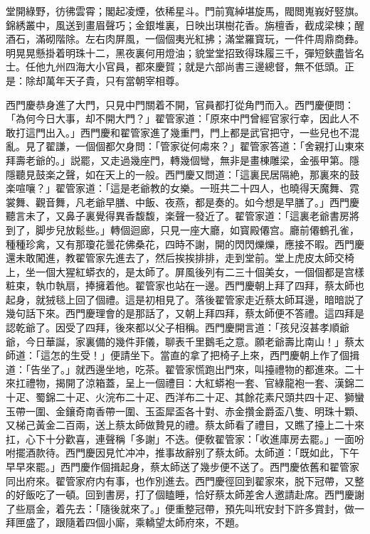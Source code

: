 堂開綠野，彷彿雲霄；閣起凌煙，依稀星斗。門前寬綽堪旋馬，閥閲嵬峩好竪旗。錦綉叢中，風送到畫眉聲巧；金銀堆裏，日映出琪樹花香。旃檀香，截成梁棟；醒酒石，滿砌階除。左右肉屏風，一個個夷光紅拂；滿堂羅寳玩，一件件周鼎商彝。明晃晃懸掛着明珠十二，黑夜裏何用燈油；貌堂堂招致得珠履三千，彈短鋏盡皆名士。任他九州四海大小官員，都來慶賀；就是六部尚書三邊總督，無不低頭。正是：除却萬年天子貴，只有當朝宰相尊。

西門慶恭身進了大門，只見中門關着不開，官員都打從角門而入。西門慶便問：「為何今日大事，却不開大門？」翟管家道：「原來中門曾經官家行幸，因此人不敢打這門出入。」西門慶和翟管家進了幾重門，門上都是武官把守，一些兒也不混亂。見了翟謙，一個個都欠身問：「管家従何䖏來？」翟管家答道：「舍親打山東來拜壽老爺的。」説罷，又走過幾座門，轉幾個彎，無非是畫棟雕梁，金張甲第。隱隱聽見鼓楽之聲，如在天上的一般。西門慶又問道：「這裏民居隔絶，那裏來的鼓楽喧嚷？」翟管家道：「這是老爺教的女樂。一班共二十四人，也曉得天魔舞、霓裳舞、觀音舞，凡老爺早膳、中飯、夜燕，都是奏的。如今想是早膳了。」西門慶聽言未了，又鼻子裏覺得異香馥馥，楽聲一發近了。翟管家道：「這裏老爺書房將到了，脚步兒放鬆些。」轉個迴廊，只見一座大廳，如寳殿僊宫。廳前僊鶴孔雀，種種珍禽，又有那瓊花曇花佛桑花，四時不謝，開的閃閃爍爍，應接不暇。西門慶還未敢闖進，教翟管家先進去了，然后挨挨排排，走到堂前。堂上虎皮太師交椅上，坐一個大猩紅蟒衣的，是太師了。屏風後列有二三十個美女，一個個都是宫樣粧束，執巾執扇，捧擁着他。翟管家也站在一邊。西門慶朝上拜了四拜，蔡太師也起身，就狨毯上回了個禮。這是初相見了。落後翟管家走近蔡太師耳邊，暗暗説了幾句話下來。西門慶理會的是那話了，又朝上拜四拜，蔡太師便不答禮。這四拜是認乾爺了。因受了四拜，後來都以父子相稱。西門慶開言道：「孩兒沒甚孝順爺爺，今日華誕，家裏備的幾件菲儀，聊表千里鵝毛之意。願老爺壽比南山！」蔡太師道：「這怎的生受！」便請坐下。當直的拿了把椅子上來，西門慶朝上作了個揖道：「告坐了。」就西邊坐地，吃茶。翟管家慌跑出門來，叫擡禮物的都進來。二十來扛禮物，揭開了涼箱蓋，呈上一個禮目：大紅蟒袍一套、官綠龍袍一套、漢錦二十疋、蜀錦二十疋、火浣布二十疋、西洋布二十疋、其餘花素尺頭共四十疋、獅蠻玉帶一圍、金鑲奇南香帶一圍、玉盃犀盃各十對、赤金攢金爵盃八隻、明珠十顆、又梯己黃金二百兩，送上蔡太師做贄見的禮。蔡太師看了禮目，又瞧了擡上二十來扛，心下十分歡喜，連聲稱「多謝」不迭。便敎翟管家：「收進庫房去罷。」一面吩咐擺酒款待。西門慶因見忙冲冲，推事故辭别了蔡太師。太師道：「既如此，下午早早來罷。」西門慶作個揖起身，蔡太師送了幾步便不送了。西門慶依舊和翟管家同出府來。翟管家府内有事，也作別進去。西門慶徑回到翟家來，脱下冠帶，又整的好飯吃了一頓。回到書房，打了個瞌睡，恰好蔡太師差舍人邀請赴席。西門慶謝了些扇金，着先去：「隨後就來了。」便重整冠帶，預先叫玳安封下許多賞封，做一拜匣盛了，跟隨着四個小廝，乘轎望太師府來，不題。

